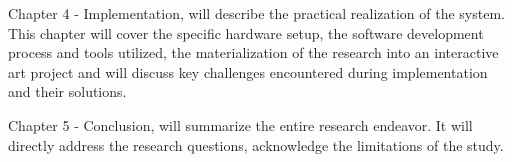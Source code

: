     Chapter 4 - Implementation, will describe the practical realization of the system. This chapter will cover the specific hardware setup, the software development process and tools utilized, the materialization of the research into an interactive art project and will discuss key challenges encountered during implementation and their solutions.\par

    Chapter 5 - Conclusion, will summarize the entire research endeavor. It will directly address the research questions, acknowledge the limitations of the study.\par